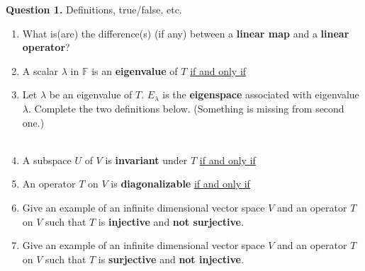 
\noindent
{\bf Question 1.} Definitions, true/false, etc.\\

\begin{enumerate}[label=(\alph*)]

\item What is(are) the difference(s) (if any) between a {\bf linear map} and a {\bf linear operator}?

\vspace*{3cm}

\item A scalar $\lambda$ in $\mathbb{F}$ is an {\bf eigenvalue} of $T$ \underline{if and only if}

\vspace*{3cm}

\item Let $\lambda$ be an eigenvalue of $T$. $E_\lambda$ is the {\bf eigenspace} associated with eigenvalue $\lambda$. Complete the two definitions below. (Something is missing from second one.) \\

\vspace*{1cm}
\\
\vspace*{1cm}


\vspace*{1cm}

\item A subspace $U$ of $V$ is {\bf invariant} under $T$ \underline{if and only if}
\vspace*{3cm}

\item An operator $T$ on $V$ is {\bf diagonalizable} \underline{if and only if}
\vspace*{3cm}




\item Give an example of an infinite dimensional vector space $V$ and 
an operator $T$ on $V$ such that $T$ is {\bf injective} and {\bf not surjective}.

\vspace*{7cm}

\item Give an example of an infinite dimensional vector space $V$ and 
an operator $T$ on $V$ such that $T$ is {\bf surjective} and {\bf not injective}.

\vspace*{5cm}

\end{enumerate}
